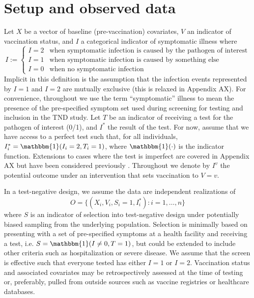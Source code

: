 \documentclass[11pt]{article}
\begin{document}
\section{Setup and observed data} \label{sec:setup}
Let $X$ be a vector of baseline (pre-vaccination) covariates, $V$ an indicator of vaccination status, and $I$ a categorical indicator of symptomatic illness where
        $$I := \begin{cases} 
        I = 2 & \text{when symptomatic infection is caused by the pathogen of interest} \\
        I = 1 & \text{when symptomatic infection is caused by something else} \\
        I = 0 & \text{when no symptomatic infection}
        \end{cases}$$
Implicit in this definition is the assumption that the infection events represented by $I = 1$ and $I = 2$ are mutually exclusive (this is relaxed in Appendix AX). For convenience, throughout we use the term ``symptomatic'' illness to mean the presence of the pre-specified symptom set used during screening for testing and inclusion in the TND study. Let $T$ be an indicator of receiving a test for the pathogen of interest (0/1), and $I^*$ the result of the test. For now, assume that we have access to a perfect test such that, for all individuals, $I^*_i = \mathbbm{1}(I_i = 2, T_i = 1)$, where $\mathbbm{1}(\cdot)$ is the indicator function. Extensions to cases where the test is imperfect are covered in Appendix AX but have been considered previously \cite{jackson2015effects}. Throughout we denote by $I^v$ the potential outcome under an intervention that sets vaccination to $V=v$. 
    
In a test-negative design, we assume the data are independent realizations of 
$$O = \{(X_i, V_i, S_i = 1, I^*_i) : i = 1, \ldots, n\}$$
where $S$ is an indicator of selection into test-negative design under potentially biased sampling from the underlying population. Selection is minimally based on presenting with a set of pre-specified symptoms at a health facility and receiving a test, i.e. $S = \mathbbm{1}(I \neq 0, T = 1)$, but could be extended to include other criteria such as hospitalization or severe disease. We assume that the screen is effective such that everyone tested has either $I=1$ or $I=2$. Vaccination status and associated covariates may be retrospectively assessed at the time of testing or, preferably, pulled from outside sources such as vaccine registries or healthcare databases. 
\end{document}
